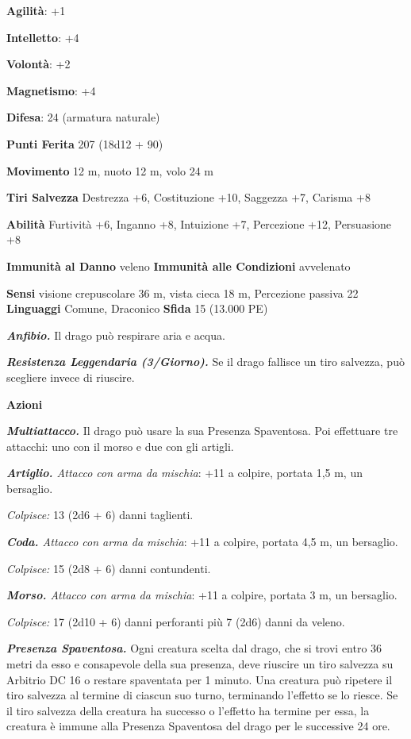 \begin{multicols}{2}
\textbf{Agilità}: +1

\textbf{Intelletto}: +4

\textbf{Volontà}: +2

\textbf{Magnetismo}: +4

\textbf{Difesa}: 24 (armatura naturale)

\textbf{Punti Ferita} 207 (18d12 + 90)

\textbf{Movimento} 12 m, nuoto 12 m, volo 24 m

\textbf{Tiri Salvezza} Destrezza +6, Costituzione +10, Saggezza +7,
Carisma +8

\textbf{Abilità} Furtività +6, Inganno +8, Intuizione +7, Percezione
+12, Persuasione +8

\textbf{Immunità al Danno} veleno \textbf{Immunità alle Condizioni}
avvelenato

\textbf{Sensi} visione crepuscolare 36 m, vista cieca 18 m, Percezione passiva
22 \textbf{Linguaggi} Comune, Draconico \textbf{Sfida} 15 (13.000 PE)

\emph{\textbf{Anfibio.}} Il drago può respirare aria e acqua.

\emph{\textbf{Resistenza Leggendaria (3/Giorno).}} Se il drago fallisce
un tiro salvezza, può scegliere invece di riuscire.

\textbf{Azioni}

\emph{\textbf{Multiattacco.}} Il drago può usare la sua Presenza
Spaventosa. Poi effettuare tre attacchi: uno con il morso e due con gli
artigli.

\emph{\textbf{Artiglio.} Attacco con arma da mischia}: +11 a colpire,
portata 1,5 m, un bersaglio.

\emph{Colpisce:} 13 (2d6 + 6) danni taglienti.

\emph{\textbf{Coda.} Attacco con arma da mischia}: +11 a colpire,
portata 4,5 m, un bersaglio.

\emph{Colpisce:} 15 (2d8 + 6) danni contundenti.

\emph{\textbf{Morso.} Attacco con arma da mischia}: +11 a colpire,
portata 3 m, un bersaglio.

\emph{Colpisce:} 17 (2d10 + 6) danni perforanti più 7 (2d6) danni da
veleno.

\emph{\textbf{Presenza Spaventosa.}} Ogni creatura scelta dal drago, che
si trovi entro 36 metri da esso e consapevole della sua presenza, deve
riuscire un tiro salvezza su Arbitrio DC 16 o restare spaventata per 1
minuto. Una creatura può ripetere il tiro salvezza al termine di ciascun
suo turno, terminando l'effetto se lo riesce. Se il tiro salvezza della
creatura ha successo o l'effetto ha termine per essa, la creatura è
immune alla Presenza Spaventosa del drago per le successive 24 ore.


\end{multicols}
